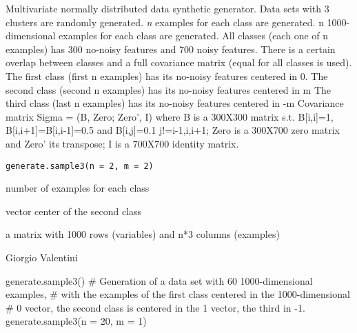 \documentclass{article}
\begin{document}
\begin{Description}\relax
Multivariate normally  distributed data synthetic generator.
Data sets with 3 clusters are randomly generated.
\emph{n} examples for each class are generated.
n 1000-dimensional examples for each class are generated.
All classes (each one of n examples) has 300 no-noisy features and 700 noisy features. There is a certain overlap 
between classes and a full covariance matrix (equal for all classes is used).
The first class (first n examples) has its no-noisy features centered in 0.
The second class (second n examples) has its no-noisy features centered in m 
The third class (last n examples) has its no-noisy features centered in -m 
Covariance matrix Sigma = (B, Zero; Zero', I) where B is a 300X300 matrix s.t. B[i,i]=1, B[i,i+1]=B[i,i-1]=0.5 and
B[i,j]=0.1 j!=i-1,i,i+1; Zero is  a 300X700 zero matrix and Zero' its transpose; I is a 700X700 identity matrix.
\end{Description}
\begin{Usage}
\begin{verbatim}
generate.sample3(n = 2, m = 2)
\end{verbatim}
\end{Usage}
\begin{Arguments}
\begin{ldescription}
\item[\code{n}] number of examples for each class 
\item[\code{m}] vector center of the second class 
\end{ldescription}
\end{Arguments}
\begin{Value}
a matrix with 1000 rows (variables) and n*3 columns (examples)
\end{Value}
\begin{Author}\relax
Giorgio Valentini 
\end{Author}
\begin{Examples}
\begin{ExampleCode}
generate.sample3()
# Generation of a data set with 60 1000-dimensional examples, 
# with the examples of the first class  centered in the 1000-dimensional 
# 0 vector, the second class is centered in the 1 vector, the third in -1. 
generate.sample3(n = 20, m = 1)
\end{ExampleCode}
\end{Examples}
\end{document}
